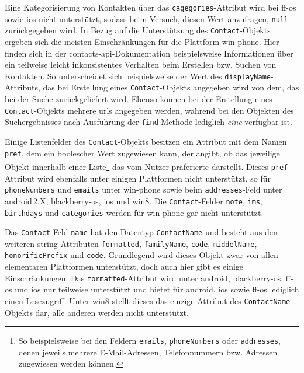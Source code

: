 Eine Kategorisierung von Kontakten über das \lstinline|cagegories|-Attribut wird bei \gls{ff-os} sowie \gls{ios} nicht unterstützt, sodass beim Versuch, diesen Wert anzufragen, \lstinline|null| zurückgegeben wird.
In Bezug auf die Unterstützung des \lstinline|Contact|-Objekts ergeben sich die meisten Einschränkungen für die Plattform \gls{win-phone}.
Hier finden sich in der \gls{contacts-api}-Dokumentation beispielsweise Informationen über ein teilweise leicht inkonsistentes Verhalten beim Erstellen bzw. Suchen von Kontakten.
So unterscheidet sich beispielsweise der Wert des \lstinline|displayName|-Attributs, das bei Erstellung eines \lstinline|Contact|-Objekts angegeben wird von dem, das bei der Suche zurückgeliefert wird.
Ebenso können bei der Erstellung eines \lstinline|Contact|-Objekts mehrere \glspl{url} angegeben werden, während bei den Objekten des Suchergebnisses nach Ausführung der \lstinline|find|-Methode lediglich \emph{eine} verfügbar ist.

Einige Listenfelder des \lstinline|Contact|-Objekts besitzen ein Attribut mit dem Namen \lstinline|pref|, dem ein boolescher Wert zugewiesen kann, der angibt, ob das jeweilige Objekt innerhalb einer Liste\footnote{So beispielsweise bei den Feldern \lstinline|emails|, \lstinline|phoneNumbers| oder \lstinline|addresses|, denen jeweils mehrere E-Mail-Adressen, Telefonnummern bzw. Adressen zugewiesen werden können.} das vom Nutzer präferierte darstellt.
Dieses \lstinline|pref|-Attribut wird ebenfalls unter einigen Plattformen nicht unterstützt, so \zB für \lstinline|phoneNumbers| und \lstinline|emails| unter \gls{win-phone} sowie beim \lstinline|addresses|-Feld unter \gls{android}\,2.X, \gls{blackberry-os}, \gls{ios} und \gls{win8}.
Die \lstinline|Contact|-Felder \mbox{\lstinline|note|,} \mbox{\lstinline|ims|,} \lstinline|birthdays| und \lstinline|categories| werden für \gls{win-phone} gar nicht unterstützt.

Das \og \lstinline|Contact|-Feld \lstinline|name| hat den Datentyp \lstinline|ContactName| und besteht aus den weiteren \gls{string}-Attributen \mbox{\lstinline|formatted|,} \mbox{\lstinline|familyName|,} \mbox{\lstinline|code|,} \mbox{\lstinline|middelName|,} \lstinline|honorificPrefix| und \lstinline|code|.
Grundlegend wird dieses Objekt zwar von allen elementaren Plattformen unterstützt, doch auch hier gibt es einige Einschränkungen.
Das \lstinline|formatted|-Attribut wird unter \gls{android}, \gls{blackberry-os}, \gls{ff-os} und \gls{ios} nur teilweise unterstützt und bietet für \gls{android}, \gls{ios} sowie \gls{ff-os} lediglich einen Lesezugriff.
Unter \gls{win8} stellt dieses das einzige Attribut des \lstinline|ContactName|-Objekts dar, alle anderen werden nicht unterstützt.

